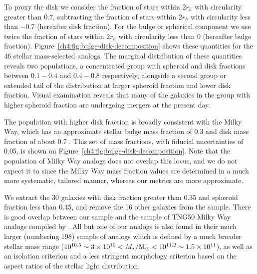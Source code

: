 
To proxy the disk we consider the fraction of stars within $2r_{h}$ with circularity greater than 0.7, subtracting the fraction of stars within $2r_{h}$ with circularity less than $-0.7$ (hereafter disk fraction). For the bulge or spherical component we use twice the fraction of stars within $2r_{h}$ with circularity less than 0 (hereafter bulge fraction). Figure~\ref{ch4:fig:bulge-disk-decomposition} shows these quantities for the 46 stellar mass-selected analogs. The marginal distribution of these quantities reveals two populations, a concentrated group with spheroid and disk fractions between $0.1-0.4$ and $0.4-0.8$ respectively, alongside a second group or extended tail of the distribution at larger spheroid fraction and lower disk fraction. Visual examination reveals that many of the galaxies in the group with higher spheroid fraction are undergoing mergers at the present day.

The population with higher disk fraction is broadly consistent with the Milky Way, which has an approximate stellar bulge mass fraction of 0.3 and disk mass fraction of about 0.7 \parencite[see][and references therein]{bland-hawthorn16}. This set of mass fractions, with fiducial uncertainties of 0.05, is shown on Figure~\ref{ch4:fig:bulge-disk-decomposition}. Note that the population of Milky Way analogs does not overlap this locus, and we do not expect it to since the Milky Way mass fraction values are determined in a much more systematic, tailored manner, whereas our metrics are more approximate.

We extract the 30 galaxies with disk fraction greater than 0.35 and spheroid fraction less than 0.45, and remove the 16 other galaxies from the sample. There is good overlap between our sample and the sample of TNG50 Milky Way analogs compiled by \textcite{tng50_mw_pillepich23}. All but one of our analogs is also found in their much larger (numbering 198) sample of analogs which is defined by a much broader stellar mass range ($10^{10.5} \sim 3\times10^{10} < M_{\star} / {\rm M}_{\odot} < 10^{11.2} \sim 1.5\times10^{11}$), as well as an isolation criterion and a less stringent morphology criterion based on the aspect ratios of the stellar light distribution.

